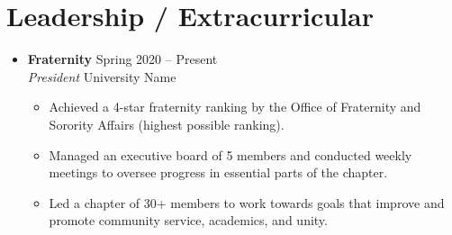 \documentclass[letterpaper,5pt]{article}
\begin{document}
    
    \section{Leadership / Extracurricular}
    \begin{itemize}
        \item[]
            \textbf{Fraternity} \hfill Spring 2020 -- Present \\
            \textit{President} \hfill University Name
            \begin{itemize}
                \item[\textbullet] Achieved a 4-star fraternity ranking by the Office of Fraternity and Sorority Affairs (highest possible ranking).
                \item[\textbullet] Managed an executive board of 5 members and conducted weekly meetings to oversee progress in essential parts of the chapter.
                \item[\textbullet] Led a chapter of 30+ members to work towards goals that improve and promote community service, academics, and unity.
            \end{itemize}
    \end{itemize}
    
\end{document}
